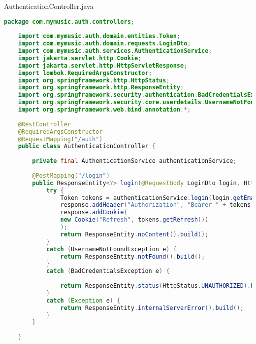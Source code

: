 AuthenticationController.java
\begin{lstlisting}[language=java]
	package com.mymusic.auth.controllers;
	
	import com.mymusic.auth.domain.entities.Token;
	import com.mymusic.auth.domain.requests.LoginDto;
	import com.mymusic.auth.services.AuthenticationService;
	import jakarta.servlet.http.Cookie;
	import jakarta.servlet.http.HttpServletResponse;
	import lombok.RequiredArgsConstructor;
	import org.springframework.http.HttpStatus;
	import org.springframework.http.ResponseEntity;
	import org.springframework.security.authentication.BadCredentialsException;
	import org.springframework.security.core.userdetails.UsernameNotFoundException;
	import org.springframework.web.bind.annotation.*;
	
	@RestController
	@RequiredArgsConstructor
	@RequestMapping("/auth")
	public class AuthenticationController {
		
		private final AuthenticationService authenticationService;
		
		@PostMapping("/login")
		public ResponseEntity<?> login(@RequestBody LoginDto login, HttpServletResponse response) {
			try {
				Token tokens = authenticationService.login(login.getEmail(), login.getPassword());
				response.addHeader("Authorization", "Bearer " + tokens.getAccess());
				response.addCookie(
				new Cookie("Refresh", tokens.getRefresh())
				);
				return ResponseEntity.noContent().build();
			}
			catch (UsernameNotFoundException e) {
				return ResponseEntity.notFound().build();
			}
			catch (BadCredentialsException e) {
				
				return ResponseEntity.status(HttpStatus.UNAUTHORIZED).build();
			}
			catch (Exception e) {
				return ResponseEntity.internalServerError().build();
			}
		}
		
	}
\end{lstlisting}

